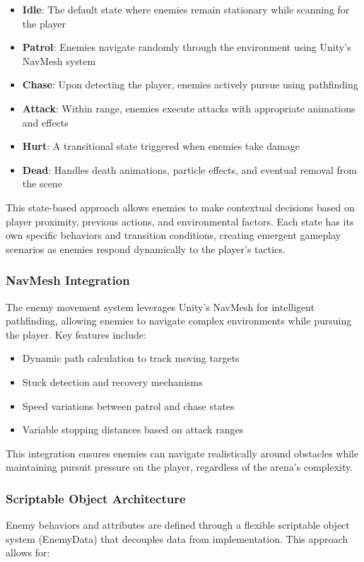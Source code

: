 \documentclass{article}
\begin{document}
    \begin{itemize}
        \item \textbf{Idle}: The default state where enemies remain stationary while scanning for the player
        \item \textbf{Patrol}: Enemies navigate randomly through the environment using Unity's NavMesh system
        \item \textbf{Chase}: Upon detecting the player, enemies actively pursue using pathfinding
        \item \textbf{Attack}: Within range, enemies execute attacks with appropriate animations and effects
        \item \textbf{Hurt}: A transitional state triggered when enemies take damage
        \item \textbf{Dead}: Handles death animations, particle effects, and eventual removal from the scene
    \end{itemize}

    This state-based approach allows enemies to make contextual decisions based on player proximity, previous actions, and environmental factors. Each state has its own specific behaviors and transition conditions, creating emergent gameplay scenarios as enemies respond dynamically to the player's tactics.

    \subsubsection{NavMesh Integration}
    The enemy movement system leverages Unity's NavMesh for intelligent pathfinding, allowing enemies to navigate complex environments while pursuing the player. Key features include:

    \begin{itemize}
        \item Dynamic path calculation to track moving targets
        \item Stuck detection and recovery mechanisms
        \item Speed variations between patrol and chase states
        \item Variable stopping distances based on attack ranges
    \end{itemize}

    This integration ensures enemies can navigate realistically around obstacles while maintaining pursuit pressure on the player, regardless of the arena's complexity.

    \subsubsection{Scriptable Object Architecture}
    Enemy behaviors and attributes are defined through a flexible scriptable object system (EnemyData) that decouples data from implementation. This approach allows for:
\end{document}
